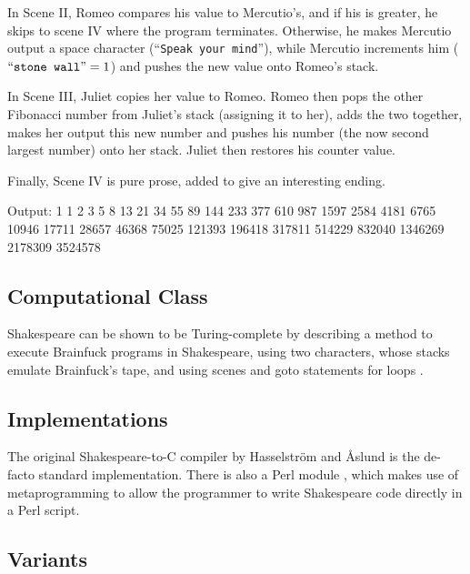 In Scene II, Romeo compares his value to Mercutio's, and if his is greater, he skips to scene IV where the program terminates. Otherwise, he makes Mercutio output a space character (“\texttt{Speak your mind}”), while Mercutio increments him ($\text{“\texttt{stone wall}”} = 1$) and pushes the new value onto Romeo's stack.



In Scene III, Juliet copies her value to Romeo. Romeo then pops the other Fibonacci number from Juliet's stack (assigning it to her), adds the two together, makes her output this new number and pushes his number (the now second largest number) onto her stack. Juliet then restores his counter value.



Finally, Scene IV is pure prose, added to give an interesting ending.



\begin{io}
Output:
1 1 2 3 5 8 13 21 34 55 89 144 233 377 610 987 1597 2584
4181 6765 10946 17711 28657 46368 75025 121393 196418
317811 514229 832040 1346269 2178309 3524578
\end{io}

\subsection{Computational Class}

Shakespeare can be shown to be Turing-complete by describing a method to execute Brainfuck programs in Shakespeare, using two characters, whose stacks emulate Brainfuck's tape, and using scenes and goto statements for loops \cite{stux2005shakespeare}.

\newpage

\subsection{Implementations}

The original Shakespeare-to-C compiler \cite{hasselstrom_shakespeare} by Hasselström and Åslund is the de-facto standard implementation. There is also a Perl module \cite{barr_lingua}, which makes use of metaprogramming to allow the programmer to write Shakespeare code directly in a Perl script.

\subsection{Variants}

